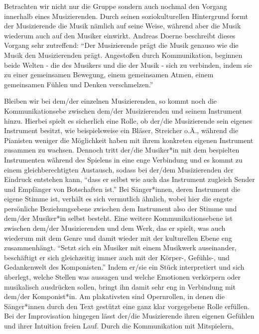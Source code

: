Betrachten wir nicht nur die Gruppe sondern auch nochmal den
Vorgang innerhalb eines Musizierenden. Durch seinen soziokulturellen Hintergrund
formt der Musizierende die Musik nämlich auf seine Weise, während aber die Musik
wiederum auch auf den Musiker einwirkt. Andreas Doerne beschreibt dieses Vorgang
sehr zutreffend: \enquote{Der Musizierende prägt die Musik genauso wie die Musik
den Musizierenden prägt. Angestoßen durch Kommunikation, beginnen beide Welten -
die des Musikers und die der Musik - sich zu verbinden, indem sie zu einer
gemeinsamen Bewegung, einem gemeinsamen Atmen, einem gemeinsamen Fühlen und
Denken verschmelzen.} \autocite[60]{doerne:umfassend_musizieren}

Bleiben wir bei
dem/der einzelnen Musizierenden, so kommt noch die Kommunikationsebe zwischen
dem/der Musizierenden und seinem Instrument hinzu. Hierbei spielt es sicherlich
eine Rolle, ob der/die Musizierende sein eigenes Instrument besitzt, wie
beispielsweise ein Bläser, Streicher o.Ä., während die Pianisten weniger die
Möglichkeit haben mit ihrem konkreten eigenen Instrument zusammen zu wachsen.
Dennoch tritt der/die Musiker*in mit dem bespielten Instrumenten während des
Spielens in eine enge Verbindung und es kommt zu einem gleichberechtigten
Austausch, sodass bei der/dem Musizierenden der Eindruck entstehen kann,
\enquote{dass er selbst wie auch das Instrument zugleich Sender und Empfänger
von Botschaften ist.} \autocite[59]{doerne:umfassend_musizieren} Bei
Sänger*innen, deren Instrument die eigene Stimme ist, verhält es sich vermutlich
ähnlich, wobei hier die engste persönliche Beziehungsebene zwischen dem
Instrument also der Stimme und dem/der Musiker*in selbst besteht. Eine weitere
Kommunikationsebene ist zwischen dem/der Musizierenden und dem Werk, das er
spielt, was auch wiederum mit dem Genre und damit wieder mit der kulturellen
Ebene eng zusammenhängt. \enquote{Setzt sich ein Musiker mit einem Musikwerk
auseinander, beschäftigt er sich gleichzeitig immer auch mit der Körper-,
Gefühls-, und Gedankenwelt des Komponisten.}
\autocite[59]{doerne:umfassend_musizieren} Indem er/sie ein Stück interpretiert
und sich überlegt, welche Stellen was aussagen und welche Emotionen verkörpern
oder musikalisch ausdrücken sollen, bringt ihn damit sehr eng in Verbindung mit
dem/der Komponist*in. Am plakativsten sind Opernrollen, in denen die
Sänger*innen durch den Text gestützt eine ganz klar vorgegebene Rolle erfüllen.
Bei der Improvisation hingegen lässt der/die Musizierende ihren eigenen Gefühlen
und ihrer Intuition freien Lauf. Durch die Kommunikation mit Mitspielern,
